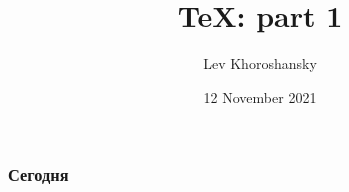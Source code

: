 \documentclass{beamer}
\title[\TeX: part 1]{\TeX: part 1}
\author{Lev Khoroshansky}
\institute[HSE]{Higher School of Economics}
\date{12 November 2021}
\begin{document}
    \frame[plain]{\titlepage}
    
    \begin{frame}
    \frametitle{Сегодня}
    \tableofcontents
    \end{frame}
    
    
    
    
    
    
\end{document}
